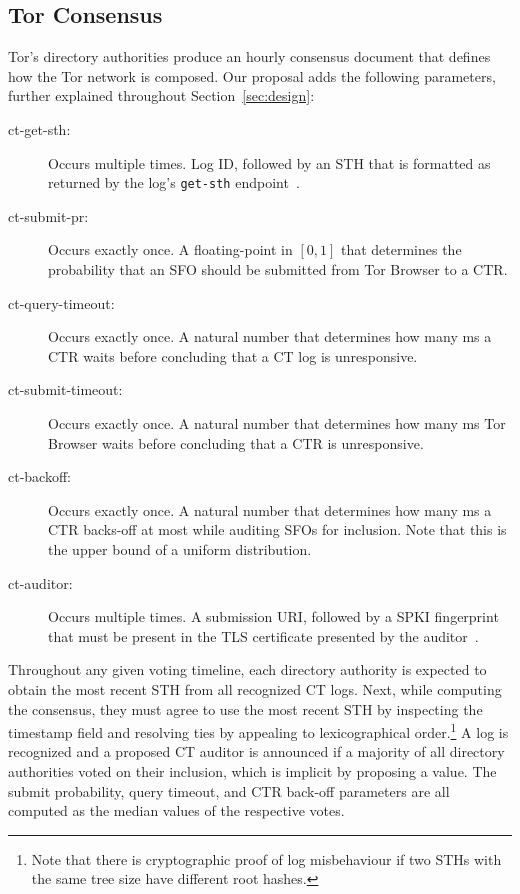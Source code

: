 \subsection{Tor Consensus}
Tor's directory authorities produce an hourly consensus document that defines
how the Tor network is composed.  Our proposal adds the following parameters,
further explained throughout Section~\ref{sec:design}:
\begin{description}
	\item[ct-get-sth:] Occurs multiple times.  Log ID, followed by an STH that is
		formatted as returned by the log's \texttt{get-sth}
		endpoint~\cite{ct,ct/bis}.
	\item[ct-submit-pr:] Occurs exactly once.  A floating-point in $[0,1]$
		that determines the probability that an SFO should be submitted from Tor
		Browser to a CTR.
	\item[ct-query-timeout:] Occurs exactly once.  A natural number that
		determines how many ms a CTR waits before concluding that a CT log is
		unresponsive.
	\item[ct-submit-timeout:] Occurs exactly once.  A natural number that
		determines how many ms Tor Browser waits before concluding that a CTR
		is unresponsive.
	\item[ct-backoff:] Occurs exactly once.  A natural number that determines
		how many ms a CTR backs-off at most while auditing SFOs for inclusion.
		Note that this is the upper bound of a uniform distribution.
	\item[ct-auditor:] Occurs multiple times.  A submission URI, followed by a
		SPKI fingerprint that must be present in the TLS certificate presented
		by the auditor~\cite{hpkp}.
\end{description}

Throughout any given voting timeline, each directory authority is expected to
obtain the most recent STH from all recognized CT logs.  Next, while computing
the consensus, they must agree to use the most recent STH by inspecting the
timestamp field and resolving ties by appealing to lexicographical
order.\footnote{%
	Note that there is cryptographic proof of log misbehaviour if two STHs with
	the same tree size have different root hashes.
}  A log is recognized and a proposed CT auditor is announced if a majority of
all directory authorities voted on their inclusion, which is implicit by
proposing a value.  The submit probability, query timeout, and CTR back-off
parameters are all computed as the median values of the respective votes.

